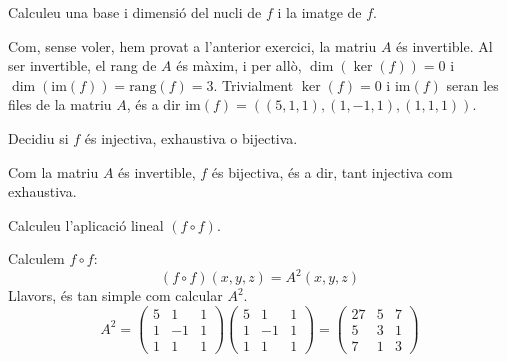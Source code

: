\documentclass[a4paper, 12pt]{article}
\begin{document}
    \begin{exercici}
        Calculeu una base i dimensió del nucli de $f$ i la imatge de $f$.
    \end{exercici}
    \begin{solucio}
        Com, sense voler, hem provat a l'anterior exercici, la matriu $A$ és invertible. Al ser
        invertible, el rang de $A$ és màxim, i per allò, $\dim(\ker(f)) = 0$ i $\dim(\text{im}(f)) = \text{rang}(f) = 3$.
        Trivialment $\ker(f) = 0$ i $\text{im}(f)$ seran les files de la matriu $A$, és a dir $\text{im}(f) = ((5, 1, 1), (1, -1, 1), (1, 1, 1))$.
    \end{solucio}
    \begin{exercici}
        Decidiu si $f$ és injectiva, exhaustiva o bijectiva.
    \end{exercici}
    \begin{solucio}
        Com la matriu $A$ és invertible, $f$ és bijectiva, és a dir, tant injectiva com exhaustiva.
    \end{solucio}
    \begin{exercici}
        Calculeu l'aplicació lineal $(f \circ f)$.
    \end{exercici}
    \begin{solucio}
        Calculem $f \circ f$:
        \begin{displaymath}
            (f \circ f)(x, y, z) = A^2(x, y, z)
        \end{displaymath}
        Llavors, és tan simple com calcular $A^2$.
        \begin{displaymath}
            A^2 =
            \left(
                \begin{array}{ccc}
                    5 & 1 & 1\\
                    1 & -1 & 1\\
                    1 & 1 & 1
                \end{array}
            \right)
            \left(
                \begin{array}{ccc}
                    5 & 1 & 1\\
                    1 & -1 & 1\\
                    1 & 1 & 1
                \end{array}
            \right)
            =
            \left(
                \begin{array}{ccc}
                    27 & 5 & 7\\
                    5 & 3 & 1\\
                    7 & 1 & 3
                \end{array}
            \right)
        \end{displaymath}
    \end{solucio}
\end{document}
